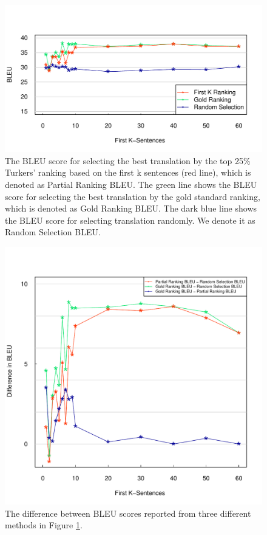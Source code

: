 \documentclass[11pt]{article}
\begin{document}
\begin{figure}[h!]
  \centering
  \includegraphics[width=\linewidth]{senlevelselect/curve1.pdf}
  \caption{ The BLEU score for selecting the  best translation by the top 25\% Turkers' ranking based on the first k sentences (red line), which is denoted as Partial Ranking BLEU. The green line shows the BLEU score for selecting the best translation by the gold standard ranking, which is denoted as Gold Ranking BLEU. The dark blue line shows the BLEU score for selecting translation randomly. We denote it as Random Selection BLEU.}
    \label{firstksenbleu}
\end{figure}
\begin{figure}[h!]
  \centering
  \includegraphics[width=\linewidth]{senlevelselect/curve2.pdf}
  \caption{ The difference between BLEU scores reported from three different methods in Figure \ref{firstksenbleu}.
}
    \label{firstksenbleudiff}
\end{figure}
\end{document}
